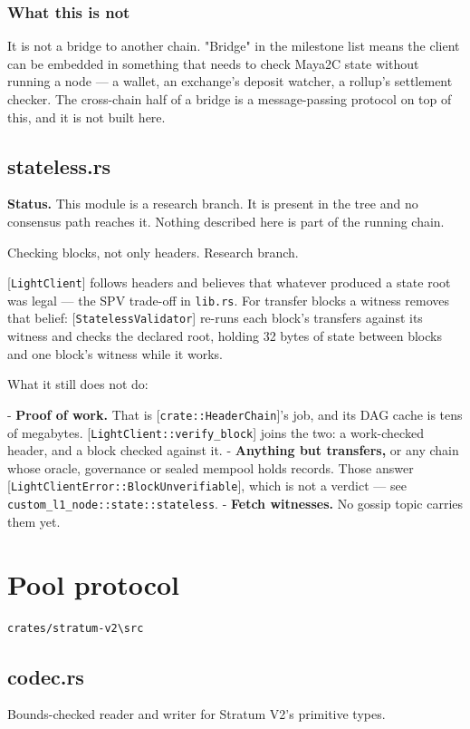 \documentclass[11pt,a4paper]{article}
\begin{document}
\subsubsection{What this is not}

It is not a bridge to another chain. "Bridge" in the milestone list means the
client can be embedded in something that needs to check Maya2C state without
running a node — a wallet, an exchange's deposit watcher, a rollup's
settlement checker. The cross-chain half of a bridge is a message-passing
protocol on top of this, and it is not built here.

\subsection{stateless.rs}
\begin{framed}\noindent\textbf{Status.} This module is a research branch. It is present in the tree and no consensus path reaches it. Nothing described here is part of the running chain.\end{framed}

Checking blocks, not only headers. Research branch.

[\texttt{LightClient}] follows headers and believes that whatever produced a state
root was legal — the SPV trade-off in \texttt{lib.rs}. For transfer blocks a
witness removes that belief: [\texttt{StatelessValidator}] re-runs each block's
transfers against its witness and checks the declared root, holding 32 bytes
of state between blocks and one block's witness while it works.

What it still does not do:

- \textbf{Proof of work.} That is [\texttt{crate::HeaderChain}]'s job, and its DAG cache
  is tens of megabytes. [\texttt{LightClient::verify\_block}] joins the two: a
  work-checked header, and a block checked against it.
- \textbf{Anything but transfers,} or any chain whose oracle, governance or
  sealed mempool holds records. Those answer
  [\texttt{LightClientError::BlockUnverifiable}], which is not a verdict — see
  \texttt{custom\_l1\_node::state::stateless}.
- \textbf{Fetch witnesses.} No gossip topic carries them yet.

\section{Pool protocol}
\noindent\texttt{crates/stratum-v2\textbackslash{}src}

\subsection{codec.rs}
Bounds-checked reader and writer for Stratum V2's primitive types.
\end{document}
